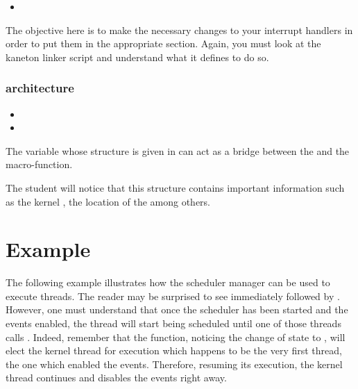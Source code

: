 \begin{itemize}
  \item
\end{itemize}

The objective here is to make the necessary changes to your interrupt handlers
in order to put them in the appropriate section.
Again, you must look at the kaneton linker script and understand what it defines
to do so.

\subsubsection*{architecture}

\begin{itemize}
  \item
  \item
\end{itemize}

The  variable whose structure is given in
 can act as a bridge between the
 and the
 macro-function.

The student will notice that this structure contains important information
such as the kernel , the location
of the  among others.

%
%

\section{Example}

The following example illustrates how the scheduler manager can be used
to execute threads. The reader may be surprised to see 
immediately followed by . However, one must understand
that once the scheduler has been started and the events enabled, the
thread will start being scheduled until one of those threads calls
. Indeed, remember that the 
function, noticing the change of state to , will
elect the kernel thread for execution which happens to be the very first
thread, the one which enabled the events. Therefore, resuming its execution,
the kernel thread continues and disables the events right away.

